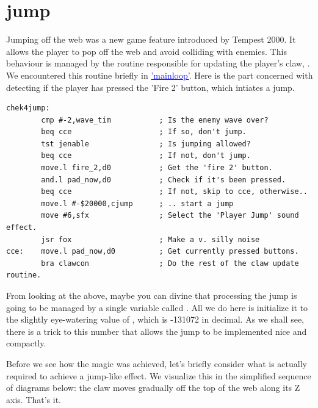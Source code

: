 \chapter{jump}
\lhead[tempest 2000]{}
\label{sec:listing}
\lstset{style=68KStyle}

Jumping off the web was a new game feature introduced by Tempest 2000. It allows the
player to pop off the web and avoid colliding with enemies. This behaviour is managed
by the routine responsible for updating the player's claw, . We encountered
this routine briefly in
\hyperref[sec:updating]{\textcolor{blue}{'mainloop'}}.
Here is the part concerned with detecting if the player has pressed the 'Fire 2' button, which
intiates a jump.

\begin{lstlisting}
chek4jump:
        cmp #-2,wave_tim           ; Is the enemy wave over?
        beq cce                    ; If so, don't jump.
        tst jenable                ; Is jumping allowed?
        beq cce                    ; If not, don't jump.
        move.l fire_2,d0           ; Get the 'fire 2' button.
        and.l pad_now,d0           ; Check if it's been pressed.
        beq cce                    ; If not, skip to cce, otherwise..
        move.l #-$20000,cjump      ; .. start a jump
        move #6,sfx                ; Select the 'Player Jump' sound effect.
        jsr fox                    ; Make a v. silly noise
cce:    move.l pad_now,d0          ; Get currently pressed buttons.
        bra clawcon                ; Do the rest of the claw update routine.
\end{lstlisting}

From looking at the above, maybe you can divine that processing the jump is going to be
managed by a single variable called . All we do here is initialize it
to the slightly eye-watering value of , which is -131072 in decimal. As we
shall see, there is a trick to this number that allows the jump to be implemented nice
and compactly.

\clearpage
Before we see how the magic was achieved, let's briefly consider what is actually required
to achieve a jump-like effect. We visualize this in the simplified sequence of diagrams 
below: the claw moves gradually off the top of the web along its Z axis. That's it.

